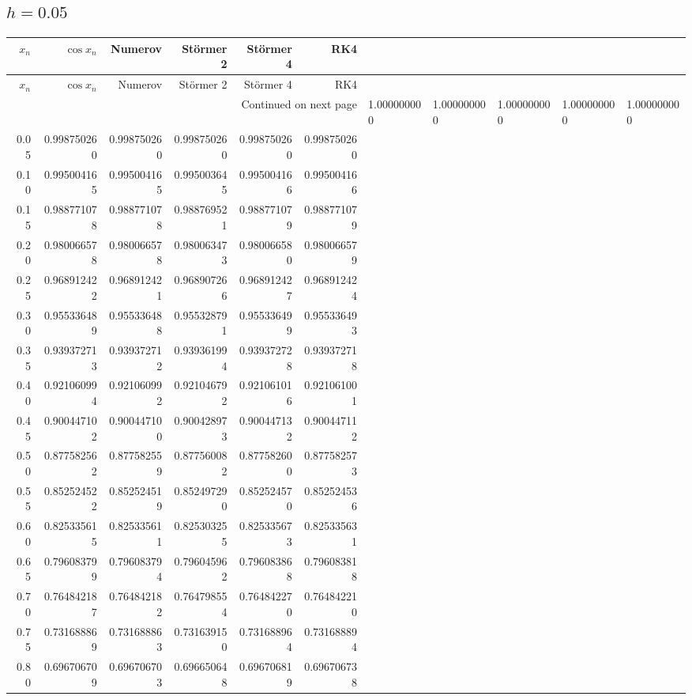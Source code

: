 \documentclass[11pt,a4paper]{article}
\newcommand{\St}{St\"ormer}
\begin{document}
\subsection{\texorpdfstring{$h=0.05$}{h=0.05}}
\begingroup\footnotesize\setlength{\tabcolsep}{5pt}
\begin{longtable}{rrrrrr}
\toprule $x_n$ & $\cos x_n$ & Numerov & \St{} 2 & \St{} 4 & RK4 \\ \midrule
\endfirsthead
\toprule $x_n$ & $\cos x_n$ & Numerov & \St{} 2 & \St{} 4 & RK4 \\ \midrule
\endhead\midrule\multicolumn{6}{r}{Continued on next page}\endfoot\bottomrule\endlastfoot
0.00 & 1.000000000 & 1.000000000 & 1.000000000 & 1.000000000 & 1.000000000 \\
0.05 & 0.998750260 & 0.998750260 & 0.998750260 & 0.998750260 & 0.998750260 \\
0.10 & 0.995004165 & 0.995004165 & 0.995003645 & 0.995004166 & 0.995004166 \\
0.15 & 0.988771078 & 0.988771078 & 0.988769521 & 0.988771079 & 0.988771079 \\
0.20 & 0.980066578 & 0.980066578 & 0.980063473 & 0.980066580 & 0.980066579 \\
0.25 & 0.968912422 & 0.968912421 & 0.968907266 & 0.968912427 & 0.968912424 \\
0.30 & 0.955336489 & 0.955336488 & 0.955328791 & 0.955336499 & 0.955336493 \\
0.35 & 0.939372713 & 0.939372712 & 0.939361994 & 0.939372728 & 0.939372718 \\
0.40 & 0.921060994 & 0.921060992 & 0.921046792 & 0.921061016 & 0.921061001 \\
0.45 & 0.900447102 & 0.900447100 & 0.900428973 & 0.900447132 & 0.900447112 \\
0.50 & 0.877582562 & 0.877582559 & 0.877560082 & 0.877582600 & 0.877582573 \\
0.55 & 0.852524522 & 0.852524519 & 0.852497290 & 0.852524570 & 0.852524536 \\
0.60 & 0.825335615 & 0.825335611 & 0.825303255 & 0.825335673 & 0.825335631 \\
0.65 & 0.796083799 & 0.796083794 & 0.796045962 & 0.796083868 & 0.796083818 \\
0.70 & 0.764842187 & 0.764842182 & 0.764798554 & 0.764842270 & 0.764842210 \\
0.75 & 0.731688869 & 0.731688863 & 0.731639150 & 0.731688964 & 0.731688894 \\
0.80 & 0.696706709 & 0.696706703 & 0.696650648 & 0.696706819 & 0.696706738 \\

\end{longtable}
\end{document}
